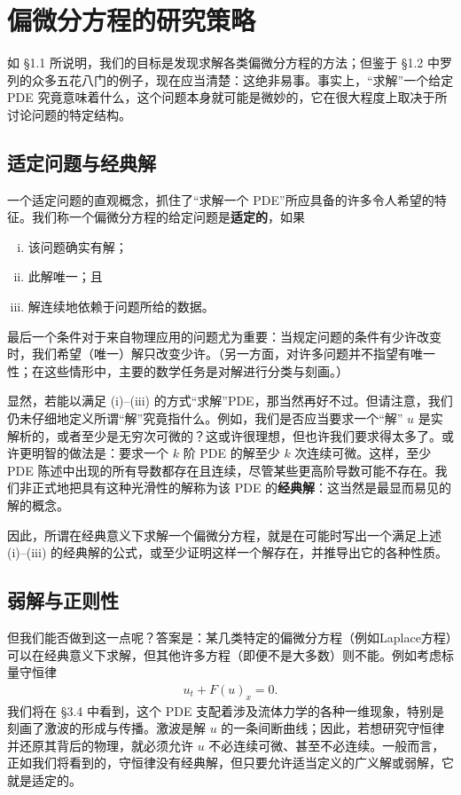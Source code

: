 \documentclass[../../main.tex]{subfiles}
\begin{document}
\section{偏微分方程的研究策略}\label{section:ch01-strategies}

如 \S1.1 所说明，我们的目标是发现求解各类偏微分方程的方法；但鉴于 \S1.2 中罗列的众多五花八门的例子，现在应当清楚：这绝非易事。事实上，``求解''一个给定 PDE 究竟意味着什么，这个问题本身就可能是微妙的，它在很大程度上取决于所讨论问题的特定结构。

\subsection{适定问题与经典解}\label{subsection:ch01-wellposed}

一个适定问题的直观概念，抓住了``求解一个 PDE''所应具备的许多令人希望的特征。我们称一个偏微分方程的给定问题是\textbf{适定的}，如果
\begin{enumerate}[(i)]
\item 该问题确实有解；
\item 此解唯一；且
\item 解连续地依赖于问题所给的数据。
\end{enumerate}
最后一个条件对于来自物理应用的问题尤为重要：当规定问题的条件有少许改变时，我们希望（唯一）解只改变少许。（另一方面，对许多问题并不指望有唯一性；在这些情形中，主要的数学任务是对解进行分类与刻画。）

显然，若能以满足 (i)--(iii) 的方式``求解''PDE，那当然再好不过。但请注意，我们仍未仔细地定义所谓``解''究竟指什么。例如，我们是否应当要求一个``解'' $u$ 是实解析的，或者至少是无穷次可微的？这或许很理想，但也许我们要求得太多了。或许更明智的做法是：要求一个 $k$ 阶 PDE 的解至少 $k$ 次连续可微。这样，至少 PDE 陈述中出现的所有导数都存在且连续，尽管某些更高阶导数可能不存在。我们非正式地把具有这种光滑性的解称为该 PDE 的\textbf{经典解}：这当然是最显而易见的解的概念。

因此，所谓在经典意义下求解一个偏微分方程，就是在可能时写出一个满足上述 (i)--(iii) 的经典解的公式，或至少证明这样一个解存在，并推导出它的各种性质。

\subsection{弱解与正则性}\label{subsection:ch01-weak}

但我们能否做到这一点呢？答案是：某几类特定的偏微分方程（例如Laplace方程）可以在经典意义下求解，但其他许多方程（即便不是大多数）则不能。例如考虑标量守恒律
\begin{align*}
u_t+F(u)_x=0.
\end{align*}
我们将在 \S3.4 中看到，这个 PDE 支配着涉及流体力学的各种一维现象，特别是刻画了激波的形成与传播。激波是解 $u$ 的一条间断曲线；因此，若想研究守恒律并还原其背后的物理，就必须允许 $u$ 不必连续可微、甚至不必连续。一般而言，正如我们将看到的，守恒律没有经典解，但只要允许适当定义的广义解或弱解，它就是适定的。
\end{document}
